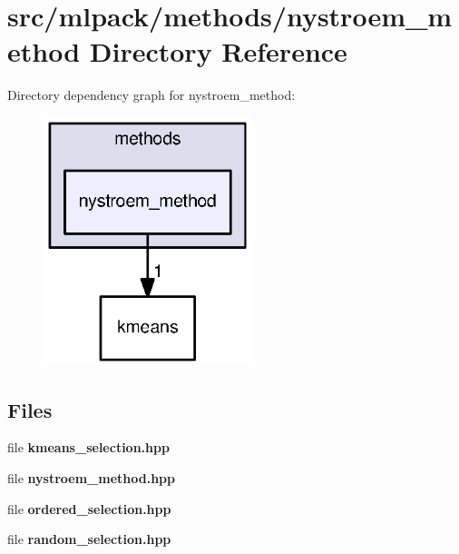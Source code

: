 \section{src/mlpack/methods/nystroem\+\_\+method Directory Reference}
\label{dir_0a2d8a1384666c530260fc12562b8d2a}
Directory dependency graph for nystroem\+\_\+method\+:
\nopagebreak
\begin{figure}[H]
\begin{center}
\leavevmode
\includegraphics[width=172pt]{dir_0a2d8a1384666c530260fc12562b8d2a_dep}
\end{center}
\end{figure}
\subsection*{Files}
\begin{DoxyCompactItemize}
\item 
file {\bf kmeans\+\_\+selection.\+hpp}
\item 
file {\bf nystroem\+\_\+method.\+hpp}
\item 
file {\bf ordered\+\_\+selection.\+hpp}
\item 
file {\bf random\+\_\+selection.\+hpp}
\end{DoxyCompactItemize}
